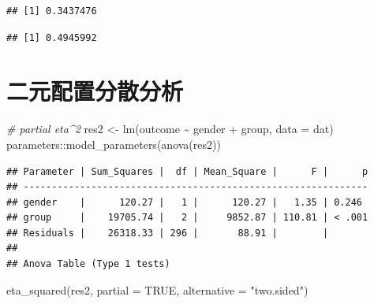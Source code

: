 \documentclass[
  ja=standard, xelatex, base=12pt]{bxjsreport}
\newenvironment{Shaded}{\begin{snugshade}}{\end{snugshade}}
\newcommand{\AttributeTok}[1]{\textcolor[rgb]{0.77,0.63,0.00}{#1}}
\newcommand{\CommentTok}[1]{\textcolor[rgb]{0.56,0.35,0.01}{\textit{#1}}}
\newcommand{\ConstantTok}[1]{\textcolor[rgb]{0.00,0.00,0.00}{#1}}
\newcommand{\DecValTok}[1]{\textcolor[rgb]{0.00,0.00,0.81}{#1}}
\newcommand{\FunctionTok}[1]{\textcolor[rgb]{0.00,0.00,0.00}{#1}}
\newcommand{\NormalTok}[1]{#1}
\newcommand{\OtherTok}[1]{\textcolor[rgb]{0.56,0.35,0.01}{#1}}
\newcommand{\SpecialCharTok}[1]{\textcolor[rgb]{0.00,0.00,0.00}{#1}}
\newcommand{\StringTok}[1]{\textcolor[rgb]{0.31,0.60,0.02}{#1}}
\begin{document}
\begin{verbatim}
## [1] 0.3437476
\end{verbatim}

\begin{Shaded}
\end{Shaded}

\begin{verbatim}
## [1] 0.4945992
\end{verbatim}

\hypertarget{ux4e8cux5143ux914dux7f6eux5206ux6563ux5206ux6790}{%
\section{二元配置分散分析}\label{ux4e8cux5143ux914dux7f6eux5206ux6563ux5206ux6790}}

\begin{Shaded}
\begin{Highlighting}[]
\CommentTok{\# partial eta\^{}2}
\NormalTok{res2 }\OtherTok{\textless{}{-}} \FunctionTok{lm}\NormalTok{(outcome }\SpecialCharTok{\textasciitilde{}}\NormalTok{ gender }\SpecialCharTok{+}\NormalTok{ group, }\AttributeTok{data =}\NormalTok{ dat)}
\NormalTok{parameters}\SpecialCharTok{::}\FunctionTok{model\_parameters}\NormalTok{(}\FunctionTok{anova}\NormalTok{(res2))}
\end{Highlighting}
\end{Shaded}

\begin{verbatim}
## Parameter | Sum_Squares |  df | Mean_Square |      F |      p
## -------------------------------------------------------------
## gender    |      120.27 |   1 |      120.27 |   1.35 | 0.246 
## group     |    19705.74 |   2 |     9852.87 | 110.81 | < .001
## Residuals |    26318.33 | 296 |       88.91 |        |       
## 
## Anova Table (Type 1 tests)
\end{verbatim}

\begin{Shaded}
\begin{Highlighting}[]
\FunctionTok{eta\_squared}\NormalTok{(res2, }\AttributeTok{partial =} \ConstantTok{TRUE}\NormalTok{, }\AttributeTok{alternative =} \StringTok{"two.sided"}\NormalTok{)}
\end{Highlighting}
\end{Shaded}
\end{document}
